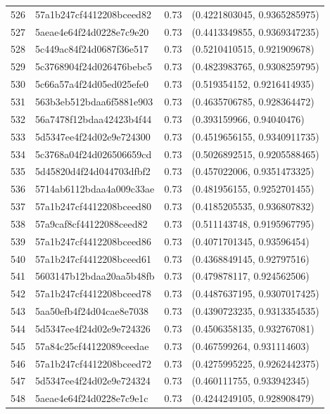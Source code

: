 \begin{table}[ht]
\begin{tabular}{rlrl}
  526 & 57a1b247cf4412208bceed82 & 0.73 & (0.4221803045, 0.9365285975) \\ 
  527 & 5aeae4e64f24d0228e7c9e20 & 0.73 & (0.4413349855, 0.9369347235) \\ 
  528 & 5c449ac84f24d0687f36e517 & 0.73 & (0.5210410515, 0.921909678) \\ 
  529 & 5c3768904f24d026476bebc5 & 0.73 & (0.4823983765, 0.9308259795) \\ 
  530 & 5c66a57a4f24d05ed025efe0 & 0.73 & (0.519354152, 0.9216414935) \\ 
  531 & 563b3eb512bdaa6f5881e903 & 0.73 & (0.4635706785, 0.928364472) \\ 
  532 & 56a7478f12bdaa42423b4f44 & 0.73 & (0.393159966, 0.94040476) \\ 
  533 & 5d5347ee4f24d02e9e724300 & 0.73 & (0.4519656155, 0.9340911735) \\ 
  534 & 5c3768a04f24d026506659cd & 0.73 & (0.5026892515, 0.9205588465) \\ 
  535 & 5d45820d4f24d044703dfbf2 & 0.73 & (0.457022006, 0.9351473325) \\ 
  536 & 5714ab6112bdaa4a009c33ae & 0.73 & (0.481956155, 0.9252701455) \\ 
  537 & 57a1b247cf4412208bceed80 & 0.73 & (0.4185205535, 0.936807832) \\ 
  538 & 57a9caf8cf44122088ceed82 & 0.73 & (0.511143748, 0.9195967795) \\ 
  539 & 57a1b247cf4412208bceed86 & 0.73 & (0.4071701345, 0.93596454) \\ 
  540 & 57a1b247cf4412208bceed61 & 0.73 & (0.4368849145, 0.92797516) \\ 
  541 & 5603147b12bdaa20aa5b48fb & 0.73 & (0.479878117, 0.924562506) \\ 
  542 & 57a1b247cf4412208bceed78 & 0.73 & (0.4487637195, 0.9307017425) \\ 
  543 & 5aa50efb4f24d04cae8e7038 & 0.73 & (0.4390723235, 0.9313354535) \\ 
  544 & 5d5347ee4f24d02e9e724326 & 0.73 & (0.4506358135, 0.932767081) \\ 
  545 & 57a84c25cf44122089ceedae & 0.73 & (0.467599264, 0.931114603) \\ 
  546 & 57a1b247cf4412208bceed72 & 0.73 & (0.4275995225, 0.9262442375) \\ 
  547 & 5d5347ee4f24d02e9e724324 & 0.73 & (0.460111755, 0.933942345) \\ 
  548 & 5aeae4e64f24d0228e7c9e1c & 0.73 & (0.4244249105, 0.928908479) \\ 

\end{tabular}
\end{table}
